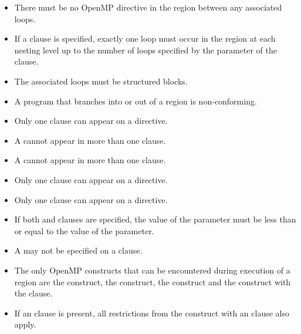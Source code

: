 \restrictions
\begin{itemize}
\item There must be no OpenMP directive in the region between any
associated loops.

\item If a  clause is specified, exactly one loop must
occur in the region at each nesting level up to the number of loops
specified by the parameter of the  clause.

\item The associated loops must be structured blocks.

\item A program that branches into or out of a  region is non-conforming.

\item Only one  clause can appear on a  directive.

\item A  cannot appear in more than one  clause.

\item A  cannot appear in more than one  clause.

\item Only one  clause can appear on a  directive.

\item Only one  clause can appear on a  directive.

\item If both  and  clauses are specified, the value of the  parameter must be less than or equal to the value of the  parameter.

\item A  may not be specified on a  clause.

\item The only OpenMP constructs that can be encountered during execution of a
 region are the  construct, the 
construct, the  construct and the  construct with
the  clause.

\item If an  clause is present, all restrictions from
  the  construct with an  clause also apply.

\bigskip


\end{itemize}
